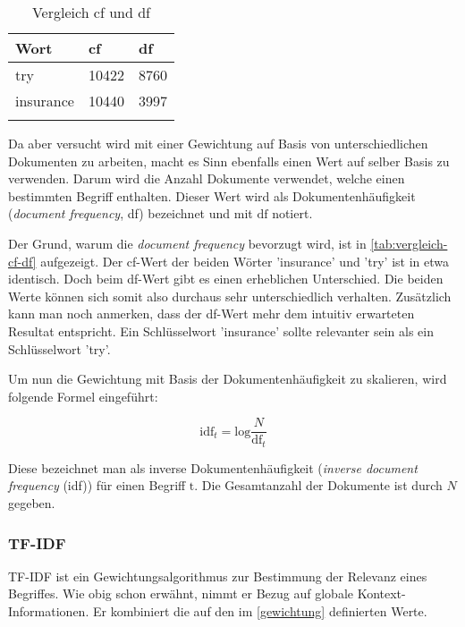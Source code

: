 \begin{longtable}{|p{2cm}| p{1cm} | p{1cm}|}
  \hline
    Wort & cf & df \\\hline
    try & 10422 & 8760 \\\hline
    insurance & 10440 & 3997 \\\hline
    \caption{Vergleich cf und df \protect\footnotemark
    }
  \label{tab:vergleich-cf-df}
\end{longtable}


Da aber versucht wird mit einer Gewichtung auf Basis von unterschiedlichen Dokumenten zu arbeiten, macht es Sinn ebenfalls einen Wert auf selber Basis zu verwenden. Darum wird die Anzahl Dokumente verwendet, welche einen bestimmten Begriff enthalten. Dieser Wert wird als Dokumentenhäufigkeit (\textit{document frequency}, df) bezeichnet und mit $\text{df}$ notiert.

Der Grund, warum die \textit{document frequency} bevorzugt wird, ist in \autoref{tab:vergleich-cf-df} aufgezeigt. Der cf-Wert der beiden Wörter 'insurance' und 'try' ist in etwa identisch. Doch beim df-Wert gibt es einen erheblichen Unterschied. Die beiden Werte können sich somit also durchaus sehr unterschiedlich verhalten. Zusätzlich kann man noch anmerken, dass der df-Wert mehr dem intuitiv erwarteten Resultat entspricht. Ein Schlüsselwort 'insurance' sollte relevanter sein als ein Schlüsselwort 'try'.

Um nun die Gewichtung mit Basis der Dokumentenhäufigkeit zu skalieren, wird folgende Formel eingeführt:

\[
\text{idf}_{t}=\text{log}\frac{N}{\text{df}_{t}}
\]

Diese bezeichnet man als inverse Dokumentenhäufigkeit (\textit{inverse document frequency} (idf)) für einen Begriff $\text{t}$. Die Gesamtanzahl der Dokumente ist durch $N$ gegeben.
\\\cite{manning2008introduction}



\subsubsection{TF-IDF}


TF-IDF ist ein Gewichtungsalgorithmus zur Bestimmung der Relevanz eines Begriffes. Wie obig schon erwähnt, nimmt er Bezug auf globale Kontext-Informationen. Er kombiniert die auf den im \autoref{gewichtung} definierten Werte.

